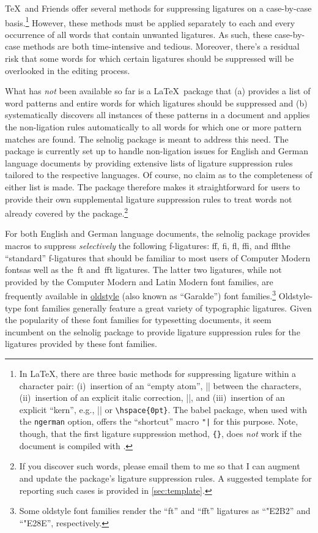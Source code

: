 \documentclass[11pt]{article}
\newcommand{\pkg}[1]{\textsf{#1}}
\newcommand{\opt}[1]{\texttt{#1}}
\begin{document}
\TeX\ and Friends offer several methods for suppressing ligatures on a case-by-case basis.\footnote{In \LaTeX, there are three basic methods for suppressing ligature within a character pair: (i)~insertion of an \enquote{empty atom}, |{}| between the characters, (ii)~insertion of an explicit italic correction, |\/|, and (iii)~insertion of an explicit \enquote{kern}, e.g., |\kern0pt| or \Verb/\hspace{0pt}/. The \pkg{babel} package, when used with the \opt{ngerman} option, offers the \enquote{shortcut} macro \Verb/"|/ for this purpose. Note, though, that the first ligature suppression method, \Verb/{}/, does \emph{not} work if the document is compiled with \LuaLaTeX.} However, these methods must be applied separately to each and every occurrence of all words that contain unwanted ligatures. As such, these case-by-case methods are both time-intensive and tedious. Moreover, there's a residual risk that some words for which certain ligatures should be suppressed will be overlooked in the editing process. 

What has \emph{not} been available so far is a \LaTeX\ package that (a) provides a list of word patterns and entire words for which ligatures should be suppressed and (b) systematically discovers all instances of these patterns in a document and applies the non-ligation rules automatically to all words for which one or more pattern matches are found. The \pkg{selnolig} package is meant to address this need. The package is currently set up to handle non-ligation issues for English and German language documents by providing extensive lists of ligature suppression rules tailored to the respective languages. Of course, no claim as to the completeness of either list is made. The package therefore makes it straightforward for users to provide their own supplemental ligature suppression rules to treat words not already covered by the package.\footnote{If you discover such words, please email them to me so that I can augment and update the package's ligature suppression rules. A suggested template for reporting such cases is provided in \cref{sec:template}.} 

For both English and German language documents, the \pkg{selnolig} package provides macros to suppress \emph{selectively} the following f-ligatures: ff, fi, fl, ffi, and ffl\textemdash the \enquote{standard} f-ligatures that should be familiar to most users of Computer Modern fonts\textemdash as well as the~ft and~fft ligatures. The latter two ligatures, while not provided by the Computer Modern and Latin Modern font families, are frequently available in \href{http://en.wikipedia.org/wiki/Serif#Old_Style}{oldstyle} (also known as \enquote{Garalde}) font families.\footnote{Some oldstyle font families render the \enquote{ft} and \enquote{fft} ligatures as \enquote{\char"E2B2} and \enquote{\char"E28E}, respectively.} Oldstyle-type font families generally feature a great variety of typographic ligatures. Given the popularity of these font families for typesetting documents, it seem incumbent on the \pkg{selnolig} package to provide ligature suppression rules for the ligatures provided by these font families.
\end{document}
